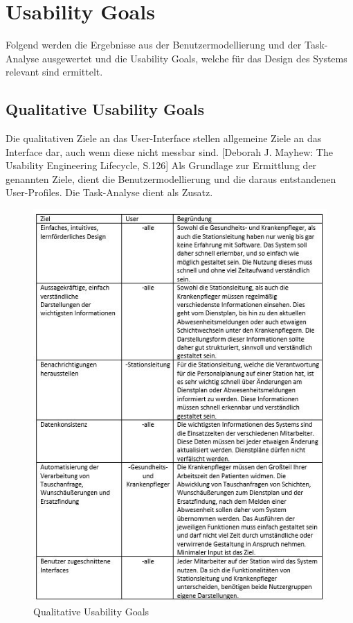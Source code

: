 \documentclass[11pt,
paper=a4,
bibtotocnumbered,	  %
liststotocnumbered,  %
DIV=calc,		  %
tablecaptionabove,	  %
headinclude,
]{article}
\begin{document}
\section{Usability Goals}
Folgend werden die Ergebnisse aus der Benutzermodellierung und der Task-Analyse ausgewertet und die Usability Goals, welche für das Design des Systems relevant sind ermittelt. 
\subsection{Qualitative Usability Goals}
Die qualitativen Ziele an das User-Interface stellen allgemeine Ziele an das Interface dar, auch wenn diese nicht messbar sind. [Deborah J. Mayhew: The Usability Engineering Lifecycle, S.126] 
Als Grundlage zur Ermittlung der genannten Ziele, dient die Benutzermodellierung und die daraus entstandenen User-Profiles. Die Task-Analyse dient als Zusatz.
\begin{figure}[H]
\includegraphics[width=1\textwidth]{Bilder/qualiUser.jpg}
\caption{Qualitative Usability Goals }
\end{figure}
\end{document}
